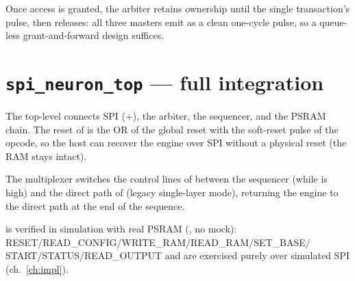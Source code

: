 Once access is granted, the arbiter retains ownership until the single transaction's
 pulse, then releases: all three masters emit  as a clean
one-cycle pulse, so a queue-less grant-and-forward design suffices.

\section{\texttt{spi\_neuron\_top} --- full integration}
The top-level connects SPI (+), the arbiter, the
sequencer,  and the PSRAM chain. The reset of 
is the OR of the global reset with the soft-reset pulse of the  opcode, so the
host can recover the engine over SPI without a physical reset (the RAM stays intact).

\begin{center}
\end{center}

The multiplexer switches the control lines of  between the sequencer
(while  is high) and the direct path of  (legacy
single-layer mode), returning the engine to the direct path at the end of the sequence.

\begin{fnnote}
 is verified in simulation with real PSRAM
(, no mock): RESET/READ\_CONFIG/WRITE\_RAM/READ\_RAM/SET\_BASE/
START/STATUS/READ\_OUTPUT and  are exercised purely over simulated SPI
(ch.~\ref{ch:impl}).
\end{fnnote}
